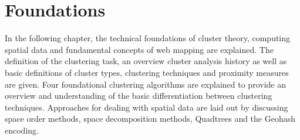 
%
%

\chapter{Foundations}
\label{chapter:foundations}

In the following chapter, the technical foundations of cluster theory, computing spatial data and fundamental concepts of web mapping are explained. The definition of the clustering task, an overview cluster analysis history as well as basic definitions of cluster types, clustering techniques and proximity measures are given. Four foundational clustering algorithms are explained to provide an overview and understanding of the basic differentiation between clustering techniques. Approaches for dealing with spatial data are laid out by discussing space order methods, space decomposition methods, Quadtrees and the Geohash encoding.










